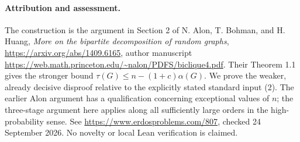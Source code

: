 \paragraph{Attribution and assessment.}
The construction is the argument in Section 2 of N. Alon, T. Bohman, and H. Huang, \emph{More on the bipartite decomposition of random graphs}, \url{https://arxiv.org/abs/1409.6165}, author manuscript \url{https://web.math.princeton.edu/~nalon/PDFS/biclique4.pdf}. Their Theorem 1.1 gives the stronger bound \(\tau(G)\leq n-(1+c)\alpha(G)\). We prove the weaker, already decisive disproof relative to the explicitly stated standard input (2). The earlier Alon argument has a qualification concerning exceptional values of \(n\); the three-stage argument here applies along all sufficiently large orders in the high-probability sense. See \url{https://www.erdosproblems.com/807}, checked 24 September 2026. No novelty or local Lean verification is claimed.
